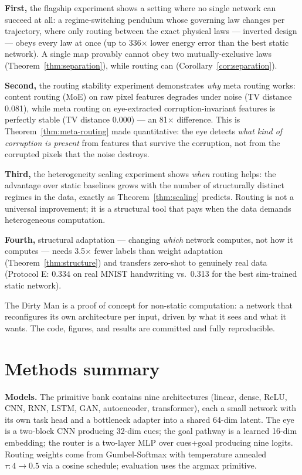 \documentclass[11pt,a4paper]{article}
\begin{document}
\textbf{First,} the flagship experiment shows a setting where no single network can succeed at all: a regime-switching pendulum whose governing law changes per trajectory, where only routing between the exact physical laws --- inverted design --- obeys every law at once (up to 336$\times$ lower energy error than the best static network). A single map provably cannot obey two mutually-exclusive laws (Theorem~\ref{thm:separation}), while routing can (Corollary~\ref{cor:separation}).

\textbf{Second,} the routing stability experiment demonstrates \emph{why} meta routing works: content routing (MoE) on raw pixel features degrades under noise (TV distance 0.081), while meta routing on eye-extracted corruption-invariant features is perfectly stable (TV distance 0.000) --- an 81$\times$ difference. This is Theorem~\ref{thm:meta-routing} made quantitative: the eye detects \emph{what kind of corruption is present} from features that survive the corruption, not from the corrupted pixels that the noise destroys.

\textbf{Third,} the heterogeneity scaling experiment shows \emph{when} routing helps: the advantage over static baselines grows with the number of structurally distinct regimes in the data, exactly as Theorem~\ref{thm:scaling} predicts. Routing is not a universal improvement; it is a structural tool that pays when the data demands heterogeneous computation.

\textbf{Fourth,} structural adaptation --- changing \emph{which} network computes, not how it computes --- needs 3.5$\times$ fewer labels than weight adaptation (Theorem~\ref{thm:structure}) and transfers zero-shot to genuinely real data (Protocol E: 0.334 on real MNIST handwriting vs.\ 0.313 for the best sim-trained static network).

The Dirty Man is a proof of concept for non-static computation: a network that reconfigures its own architecture per input, driven by what it sees and what it wants. The code, figures, and results are committed and fully reproducible.

\section*{Methods summary}
\label{sec:methods}
\noindent\textbf{Models.} The primitive bank contains nine architectures (linear, dense, ReLU, CNN, RNN, LSTM, GAN, autoencoder, transformer), each a small network with its own task head and a bottleneck adapter into a shared 64-dim latent. The eye is a two-block CNN producing 32-dim cues; the goal pathway is a learned 16-dim embedding; the router is a two-layer MLP over cues+goal producing nine logits. Routing weights come from Gumbel-Softmax with temperature annealed $\tau: 4\to0.5$ via a cosine schedule; evaluation uses the argmax primitive.
\end{document}
